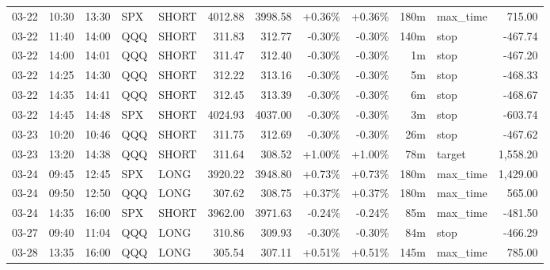 \documentclass[11pt,a4paper]{article}
\begin{document}
\begin{center}
\begin{longtable}{>{\color{txtmain}}l l l l l r r r r r >{\color{txtmain}}l r}
03-22 & 10:30 & 13:30 & SPX & SHORT & 4012.88 & 3998.58 & \textcolor{wingreen}{+0.36\%} & \textcolor{wingreen}{+0.36\%} & 180m & max\_time & \textcolor{wingreen}{715.00} \\
03-22 & 11:40 & 14:00 & QQQ & SHORT & 311.83 & 312.77 & \textcolor{lossred}{-0.30\%} & \textcolor{lossred}{-0.30\%} & 140m & stop & \textcolor{lossred}{-467.74} \\
03-22 & 14:00 & 14:01 & QQQ & SHORT & 311.47 & 312.40 & \textcolor{lossred}{-0.30\%} & \textcolor{lossred}{-0.30\%} & 1m & stop & \textcolor{lossred}{-467.20} \\
03-22 & 14:25 & 14:30 & QQQ & SHORT & 312.22 & 313.16 & \textcolor{lossred}{-0.30\%} & \textcolor{lossred}{-0.30\%} & 5m & stop & \textcolor{lossred}{-468.33} \\
03-22 & 14:35 & 14:41 & QQQ & SHORT & 312.45 & 313.39 & \textcolor{lossred}{-0.30\%} & \textcolor{lossred}{-0.30\%} & 6m & stop & \textcolor{lossred}{-468.67} \\
03-22 & 14:45 & 14:48 & SPX & SHORT & 4024.93 & 4037.00 & \textcolor{lossred}{-0.30\%} & \textcolor{lossred}{-0.30\%} & 3m & stop & \textcolor{lossred}{-603.74} \\
03-23 & 10:20 & 10:46 & QQQ & SHORT & 311.75 & 312.69 & \textcolor{lossred}{-0.30\%} & \textcolor{lossred}{-0.30\%} & 26m & stop & \textcolor{lossred}{-467.62} \\
03-23 & 13:20 & 14:38 & QQQ & SHORT & 311.64 & 308.52 & \textcolor{wingreen}{+1.00\%} & \textcolor{wingreen}{+1.00\%} & 78m & target & \textcolor{wingreen}{1,558.20} \\
03-24 & 09:45 & 12:45 & SPX & LONG & 3920.22 & 3948.80 & \textcolor{wingreen}{+0.73\%} & \textcolor{wingreen}{+0.73\%} & 180m & max\_time & \textcolor{wingreen}{1,429.00} \\
03-24 & 09:50 & 12:50 & QQQ & LONG & 307.62 & 308.75 & \textcolor{wingreen}{+0.37\%} & \textcolor{wingreen}{+0.37\%} & 180m & max\_time & \textcolor{wingreen}{565.00} \\
03-24 & 14:35 & 16:00 & SPX & SHORT & 3962.00 & 3971.63 & \textcolor{lossred}{-0.24\%} & \textcolor{lossred}{-0.24\%} & 85m & max\_time & \textcolor{lossred}{-481.50} \\
03-27 & 09:40 & 11:04 & QQQ & LONG & 310.86 & 309.93 & \textcolor{lossred}{-0.30\%} & \textcolor{lossred}{-0.30\%} & 84m & stop & \textcolor{lossred}{-466.29} \\
03-28 & 13:35 & 16:00 & QQQ & LONG & 305.54 & 307.11 & \textcolor{wingreen}{+0.51\%} & \textcolor{wingreen}{+0.51\%} & 145m & max\_time & \textcolor{wingreen}{785.00} \\

\end{longtable}
\end{center}
\end{document}
